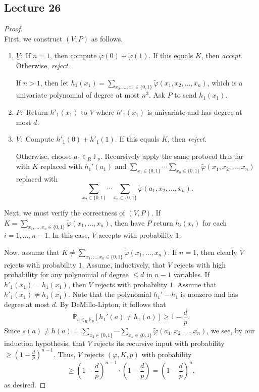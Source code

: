 \documentclass[10pt,letterpaper,cm]{nupset}
\theoremstyle{definition}
\theoremstyle{theorem}
\theoremstyle{remark}
\newcommand{\F}{\mathbb F}
\newcommand{\1}{\mathbf{1}}
\newcommand{\0}{\vec 0}
\begin{document}
\subsection{Lecture 26}

\begin{proof} $ $
\\First, we construct $(V, P)$ as follows. 
\begin{enumerate}
\item $\underline{V}:$ If $n=1$, then compute $\tilde{\varphi}(0) + \tilde{\varphi}(1)$. If this equals $K$, then \textit{accept}. Otherwise, \textit{reject}. 

If $n>1$, then let $h_1(x_1) = \sum_{x_2, \ldots, x_n \in \{0,1\}} \tilde{\varphi}(x_1, x_2, \ldots, x_n)$, which is a univariate polynomial of degree at most $n^3$. Ask $P$ to send $h_1(x_1)$. 
\item $\underline{P}:$ Return  $h'_1(x_1)$ to $V$ where $h'_1(x_1)$ is univariate and has degree at most $d$. 
\item $\underline{V}:$ Compute $h'_1(0) + h'_1(1)$. If this equals $K$, then \textit{reject}. 

Otherwise,  choose $a_1 \in_R \F_p$. Recursively apply the same protocol thus far with $K$ replaced with $h_1'(a_1)$ and $ \sum_{x_1 \in \{0,1\}} \cdots \sum_{x_n \in \{0,1\}} \tilde{\varphi}(x_1, x_2, \ldots, x_n)$ replaced with $$\sum_{x_2 \in \{0,1\}} \cdots \sum_{x_n \in \{0,1\}} \tilde{\varphi}(a_1, x_2, \ldots, x_n).$$
\end{enumerate}
Next, we must verify the correctness of $(V,P)$. If $K = \sum_{x_1, \ldots, x_n \in \{0,1\}} \tilde{\varphi}(x_1, \ldots, x_n)$, then have $P$ return $h_i(x_i)$ for each $i=1, \ldots, {n-1}$. In this case, $V$ accepts with probability $1$. 

\medskip

 Now, assume that $K \ne \sum_{x_1, \ldots, x_n \in \{0,1\}} \tilde{\varphi}(x_1, \ldots, x_n)$.  If $n=1$, then clearly $V$ rejects with probability $1$. Assume, inductively, that $V$ rejects with high probability for any polynomial of degree $\leq d$ in $n-1$ variables. If $h'_1(x_1) = h_1(x_1)$, then $V$ rejects with probability $1$. Assume that $h'_1(x_1) \ne h_1(x_1)$.  Note that the polynomial $h_1' - h_1$ is nonzero and has degree at most $d$.  By DeMillo-Lipton, it follows that  $$\mathbb{P}_{a \in_R \F_p} [h_1'(a) \ne h_1(a)] \geq 1- \frac{d}{p}.$$ Since $s(a) \ne h(a) = \sum_{x_2 \in \{0,1\}} \cdots \sum_{x_n \in \{0,1\}} \tilde{\varphi}(a_1, x_2, \ldots, x_n)$, we see, by our induction hypothesis, that $V$ rejects its recursive input with probability $\geq (1-\frac{d}{p})^{n-1}$. Thus, $V$ rejects $(\varphi, K, p)$ with probability $$ \geq \left(1-\frac{d}{p}\right)^{n-1} \cdot \left(1-\frac{d}{p}\right) = \left(1-\frac{d}{p}\right)^{n},$$ as desired.
\end{proof}
\end{document}
